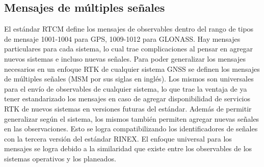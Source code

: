 \documentclass[a4paper,12pt,oneside,onecolumn,final,openright]{book}%
\begin{document}
\subsection{Mensajes de múltiples señales}
	El estándar RTCM define los mensajes de observables dentro del rango de tipos de mensaje 1001-1004 para GPS, 1009-1012 para GLONASS. Hay mensajes particulares para cada sistema, lo cual trae complicaciones al pensar en agregar nuevos sistemas e incluso nuevas señales. Para poder generalizar los mensajes necesarios en un enfoque RTK de cualquier sistema GNSS se definen los mensajes de múltiples señales (MSM por sus siglas en inglés). Los mismos son universales para el envío de observables de cualquier sistema, lo que trae la ventaja de ya tener estandarizado los mensajes en caso de agregar disponibilidad de servicios RTK de nuevos sistemas en versiones futuras del estándar. Además de permitir generalizar según el sistema, los mismos también permiten agregar nuevas señales en las observaciones. Esto se logra compatibilizando los identificadores de señales con la tercera versión del estándar RINEX. El enfoque universal para los mensajes se logra debido a la similaridad que existe entre los observables de los sistemas operativos y los planeados.
\end{document}
